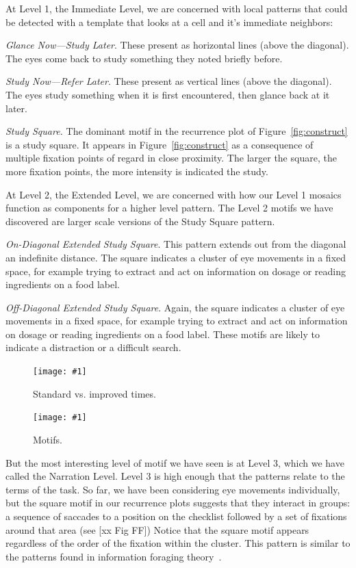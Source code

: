 \documentclass[journal]{vgtc}                %
\newcommand{\insertpicture}[2]{\begin{center}\texttt{[image: \#1]}\end{center}}
\begin{document}
At Level 1, the Immediate Level, we are concerned with local patterns that could be detected with a template that looks at a cell and it's immediate neighbors:

\emph{Glance Now—Study Later}. These present as horizontal lines (above the
diagonal). The eyes come back to study something they noted briefly before.

\emph{Study Now—Refer Later}. These present as vertical lines (above the
diagonal). The eyes study something when it is first encountered, then
glance back at it later.

\emph{Study Square.} The dominant motif in the recurrence plot of Figure~\ref{fig:construct} is a study square. It appears in  Figure~\ref{fig:construct} as a consequence of multiple fixation 
points of regard in close proximity. The larger the square, the 
more fixation points, the more intensity is indicated the study.

At Level 2, the Extended Level, we are concerned with how our Level 1 mosaics function as components for a higher level pattern. The Level 2 motifs we have discovered are larger scale versions of the Study Square pattern.

\emph{On-Diagonal Extended Study Square}.  This pattern extends out from the diagonal an indefinite distance. The square indicates a cluster of eye movements in a fixed space, for example trying to extract and act on information on dosage or reading ingredients on a food label.

\emph{Off-Diagonal Extended Study Square}.  Again, the square indicates a cluster of eye movements in a fixed space, for example trying to extract and act on information on dosage or reading ingredients on a food label. These motifs are likely to indicate a distraction or a difficult search.

\begin{figure}
\insertpicture{figures/time.pdf}{0.5}
\caption{Standard vs. improved times.\label{fig:time}}
\end{figure}

\begin{figure}
\insertpicture{figures/motifs.pdf}{0.5}
\caption{Motifs.\label{fig:motifs}}
\end{figure}

But the most interesting level of motif we have seen is at Level 3, which we have called the Narration Level. Level 3 is high enough that the patterns relate to the terms of the task.  So
far, we have been considering eye movements individually, but the square
motif in our recurrence plots suggests that they interact in groups: a
sequence of saccades to a position on the checklist followed by a set of
fixations around that area (see [xx Fig FF]) Notice that the square motif
appears regardless of the order of the fixation within the cluster. This
pattern is similar to the patterns found in information foraging
theory~\cite{Pirolli_1999}. 
\end{document}
